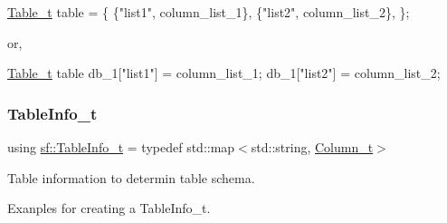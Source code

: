 \begin{DoxyCode}
\hyperlink{namespacesf_a11fc7064fe56167aaff3e5fea85ac7a2}{Table\_t} table = \{
    \{\textcolor{stringliteral}{"list1"}, column\_list\_1\},
    \{\textcolor{stringliteral}{"list2"}, column\_list\_2\},
\};
\end{DoxyCode}


or,


\begin{DoxyCode}
\hyperlink{namespacesf_a11fc7064fe56167aaff3e5fea85ac7a2}{Table\_t} table
db\_1[\textcolor{stringliteral}{"list1"}] = column\_list\_1;
db\_1[\textcolor{stringliteral}{"list2"}] = column\_list\_2;
\end{DoxyCode}
 \mbox{\label{namespacesf_a4427debefb8b5121ea783ab2a93a8e50}} 
\subsubsection{\texorpdfstring{Table\+Info\+\_\+t}{TableInfo\_t}}
{\footnotesize\ttfamily using \hyperlink{namespacesf_a4427debefb8b5121ea783ab2a93a8e50}{sf\+::\+Table\+Info\+\_\+t} = typedef std\+::map$<$std\+::string, \hyperlink{namespacesf_a390d6a976138adf32ace872bbd298a30}{Column\+\_\+t}$>$}



Table information to determin table schema. 

Exanples for creating a Table\+Info\+\_\+t.


